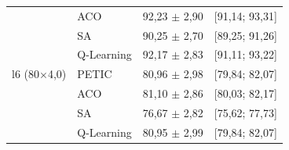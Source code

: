 \begin{table}[htb]
\begin{tabular}{llcc}
         & ACO & 92,23 $\pm$ 2,90 & [91,14; 93,31] \\
         & SA & 90,25 $\pm$ 2,70 & [89,25; 91,26] \\
         & Q-Learning & 92,17 $\pm$ 2,83 & [91,11; 93,22] \\
        \hline
        l6 (80$\times$4,0) & PETIC & 80,96 $\pm$ 2,98 & [79,84; 82,07] \\
         & ACO & 81,10 $\pm$ 2,86 & [80,03; 82,17] \\
         & SA & 76,67 $\pm$ 2,82 & [75,62; 77,73] \\
         & Q-Learning & 80,95 $\pm$ 2,99 & [79,84; 82,07] \\
        \hline
    \end{tabular}
\end{table}

